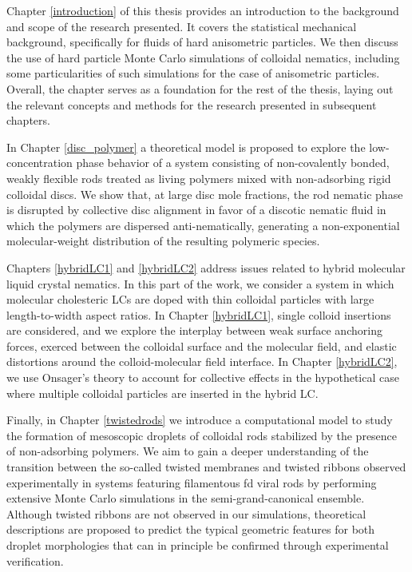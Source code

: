 Chapter \ref{introduction} of this thesis provides an introduction to the background and scope of the research presented. It covers the statistical mechanical background, specifically for fluids of hard anisometric particles. We then discuss the use of hard particle Monte Carlo simulations of colloidal nematics, including some particularities of such simulations for the case of anisometric particles. Overall, the chapter serves as a foundation for the rest of the thesis, laying out the relevant concepts and methods for the research presented in subsequent chapters.

In Chapter \ref{disc_polymer} a theoretical model is proposed to explore the low-concentration phase behavior of a system consisting of non-covalently bonded, weakly flexible rods treated as living polymers mixed with non-adsorbing rigid colloidal discs. We show that, at large disc mole fractions, the rod nematic phase is disrupted by collective disc alignment in favor of a discotic nematic fluid in which the polymers are dispersed anti-nematically, generating a non-exponential molecular-weight distribution of the resulting polymeric species.

Chapters \ref{hybridLC1} and \ref{hybridLC2} address issues related to hybrid molecular liquid crystal nematics. In this part of the work, we consider a system in which molecular cholesteric LCs are doped with thin colloidal particles with large length-to-width aspect ratios. In Chapter \ref{hybridLC1}, single colloid insertions are considered, and we explore the interplay between weak surface anchoring forces, exerced between the colloidal surface and the molecular field, and elastic distortions around the colloid-molecular field interface. In Chapter \ref{hybridLC2}, we use Onsager's theory to account for collective effects in the hypothetical case where multiple colloidal particles are inserted in the hybrid LC.

Finally, in Chapter  \ref{twistedrods} we introduce a computational model to study the formation of mesoscopic droplets of colloidal rods stabilized by the presence of non-adsorbing polymers. We aim to gain a deeper understanding of the transition between the so-called twisted membranes and twisted ribbons observed experimentally in systems featuring filamentous fd viral rods \cite{Gibaud2012} by performing extensive Monte Carlo simulations in the semi-grand-canonical ensemble. Although twisted ribbons are not observed in our simulations, theoretical descriptions are proposed to predict the typical geometric features for both droplet morphologies that can in principle be confirmed through experimental verification.


